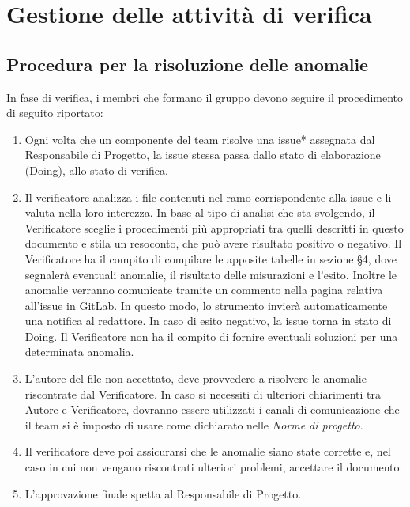 \section{Gestione delle attività di verifica}
\subsection{Procedura per la risoluzione delle anomalie}
In fase di verifica, i membri che formano il gruppo devono seguire il procedimento di seguito riportato:
\begin{enumerate}
\item Ogni volta che un componente del team risolve una issue* assegnata dal Responsabile di Progetto, la issue stessa passa dallo stato di elaborazione (Doing), allo stato di verifica.
\item Il verificatore analizza i file contenuti nel ramo corrispondente alla issue e li valuta nella loro interezza. In base al tipo di analisi che sta svolgendo, il Verificatore sceglie i procedimenti più appropriati tra quelli descritti in questo documento e stila un resoconto, che può avere risultato positivo o negativo.
Il Verificatore ha il compito di compilare le apposite tabelle in sezione §4, dove segnalerà eventuali anomalie, il risultato delle misurazioni e l'esito. Inoltre le anomalie verranno comunicate tramite un commento nella pagina relativa all'issue in GitLab. In questo modo, lo strumento invierà automaticamente una notifica al redattore. In caso di esito negativo, la issue torna in stato di Doing. Il Verificatore non ha il compito di fornire eventuali soluzioni per una determinata anomalia.
\item L'autore del file non accettato, deve provvedere a risolvere le anomalie riscontrate dal Verificatore. In caso si necessiti di ulteriori chiarimenti tra Autore e Verificatore, dovranno essere utilizzati i canali di comunicazione che il team si è imposto di usare come dichiarato nelle \textit{Norme di progetto}.
\item Il verificatore deve poi assicurarsi che le anomalie siano state corrette e, nel caso in cui non vengano riscontrati ulteriori problemi, accettare il documento.
\item L'approvazione finale spetta al Responsabile di Progetto.
\end{enumerate}



